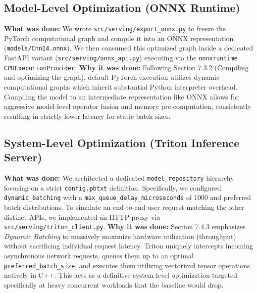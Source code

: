 \documentclass{article}
\begin{document}
\subsection{Model-Level Optimization (ONNX Runtime)}
\textbf{What was done:} We wrote \texttt{src/serving/export\_onnx.py} to freeze the PyTorch computational graph and compile it into an ONNX representation (\texttt{models/Cnn14.onnx}). We then consumed this optimized graph inside a dedicated FastAPI variant (\texttt{src/serving/onnx\_api.py}) executing via the \texttt{onnxruntime} \texttt{CPUExecutionProvider}.
\newline
\textbf{Why it was done:} Following Section 7.3.2 (Compiling and optimizing the graph), default PyTorch execution utilizes dynamic computational graphs which inherit substantial Python interpreter overhead. Compiling the model to an intermediate representation like ONNX allows for aggressive model-level operator fusion and memory pre-computation, consistently resulting in strictly lower latency for static batch sizes.

\subsection{System-Level Optimization (Triton Inference Server)}
\textbf{What was done:} We architected a dedicated \texttt{model\_repository} hierarchy focusing on a strict \texttt{config.pbtxt} definition. Specifically, we configured \texttt{dynamic\_batching} with a \texttt{max\_queue\_delay\_microseconds} of 1000 and preferred batch distributions. To simulate an end-to-end user request matching the other distinct APIs, we implemented an HTTP proxy via \texttt{src/serving/triton\_client.py}.
\newline
\textbf{Why it was done:} Section 7.4.3 emphasizes \textit{Dynamic Batching} to massively maximize hardware utilization (throughput) without sacrificing individual request latency. Triton uniquely intercepts incoming asynchronous network requests, queues them up to an optimal \texttt{preferred\_batch\_size}, and executes them utilizing vectorized tensor operations natively in C++. This acts as a definitive system-level optimization targeted specifically at heavy concurrent workloads that the baseline would drop.
\end{document}
